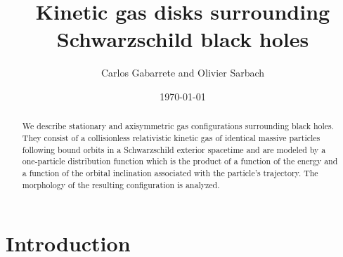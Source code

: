 \documentclass{appolb}
\begin{document}
\title{Kinetic gas disks surrounding Schwarzschild black holes
}
\author{Carlos Gabarrete and Olivier Sarbach
\address{Instituto de F\'isica y Matem\'aticas,
Universidad Michoacana de San Nicol\'as de Hidalgo,
Edificio C-3, Ciudad Universitaria, 58040 Morelia, Michoac\'an, M\'exico.}}

\maketitle

\begin{abstract}
We describe stationary and axisymmetric gas configurations surrounding black holes. They consist of a collisionless relativistic kinetic gas of identical massive particles following bound orbits in a Schwarzschild exterior spacetime and are modeled by a one-particle distribution function which is the product of a function of the energy and a function of the orbital inclination associated with the particle's trajectory. The morphology of the resulting configuration is analyzed.
\end{abstract}

\date{\today}




\section{Introduction}
\label{Sec:Introduction}
\end{document}
